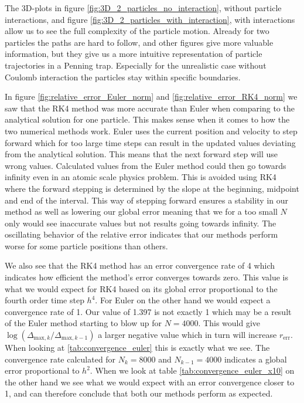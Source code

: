 \documentclass[english,notitlepage,reprint,nofootinbib]{revtex4-1}  %
\begin{document}
The 3D-plots in figure \ref{fig:3D_2_particles_no_interaction}, without
particle interactions, and figure \ref{fig:3D_2_particles_with_interaction}, with interactions allow us to see the full complexity of the particle motion.
Already for two particles the paths are hard to follow, and other figures give more valuable information, but they give us a more intuitive representation of particle trajectories in a Penning trap. Especially for the unrealistic case without Coulomb interaction the particles stay within specific boundaries.

In figure \ref{fig:relative_error_Euler_norm} and \ref{fig:relative_error_RK4_norm} we saw that the RK4 method was more accurate than Euler when comparing to the analytical solution for one particle. This makes sense when it comes to how the two numerical methods work. Euler uses the current position and velocity to step forward which for too large time steps can result in the updated values deviating from the analytical solution. This means that the next forward step will use wrong values. Calculated values from the Euler method could then go towards infinity even in an atomic scale physics problem. This is avoided using RK4 where the forward stepping is determined by the slope at the beginning, midpoint and end of the interval. This way of stepping forward ensures a stability in our method as well as lowering our global error meaning that we for a too small $N$ only would see inaccurate values but not results going towards infinity. The oscillating behavior of the relative error indicates that our methods perform worse for some particle positions than others.

We also see that the RK4 method has an error convergence rate of 4 which indicates how efficient the method's error converges towards zero. This value is what we would expect for RK4 based on its global error proportional to the fourth order time step $h^4$. For Euler on the other hand we would expect a convergence rate of 1. Our value of 1.397 is not exactly 1 which may be a result of the Euler method starting to blow up for $N=4000$. This would give $\log(\Delta_{\text{max},k}/\Delta_{\text{max},k-1})$ a larger negative value which in turn will increase $r_{\text{err}}$. When looking at \ref{tab:convergence_euler} this is exactly what we see. The convergence rate calculated for $N_k = 8000$ and $N_{k-1} = 4000$ indicates a global error proportional to $h^2$. When we look at table \ref{tab:convergence_euler_x10} on the other hand we see what we would expect with an error convergence closer to 1, and can therefore conclude that both our methods perform as expected.
\end{document}
